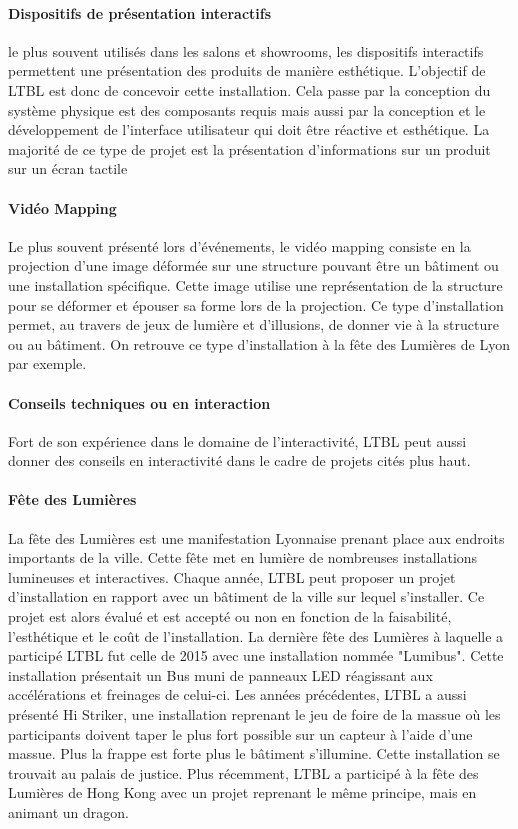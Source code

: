 \paragraph{Dispositifs de présentation interactifs} le plus souvent utilisés dans les salons et showrooms, les dispositifs interactifs permettent une présentation des produits de manière esthétique.
L'objectif de LTBL est donc de concevoir cette installation.
Cela passe par la conception du système physique est des composants requis mais aussi par la conception et le développement de l'interface utilisateur qui doit être réactive et esthétique.
La majorité de ce type de projet est la présentation d'informations sur un produit sur un écran tactile

\paragraph{Vidéo Mapping} Le plus souvent présenté lors d'événements, le vidéo mapping consiste en la projection d'une image déformée sur une structure pouvant être un bâtiment ou une installation spécifique.
Cette image utilise une représentation de la structure pour se déformer et épouser sa forme lors de la projection.
Ce type d'installation permet, au travers de jeux de lumière et d'illusions, de donner vie à la structure ou au bâtiment.
On retrouve ce type d'installation à la fête des Lumières de Lyon par exemple.

\paragraph{Conseils techniques ou en interaction} Fort de son expérience dans le domaine de l'interactivité, LTBL peut aussi donner des conseils en interactivité dans le cadre de projets cités plus haut.

\paragraph{Fête des Lumières} La fête des Lumières est une manifestation Lyonnaise prenant place aux endroits importants de la ville.
Cette fête met en lumière de nombreuses installations lumineuses et interactives.
Chaque année, LTBL peut proposer un projet d'installation en rapport avec un bâtiment de la ville sur lequel s'installer.
Ce projet est alors évalué et est accepté ou non en fonction de la faisabilité, l'esthétique et le coût de l'installation.
La dernière fête des Lumières à laquelle a participé LTBL fut celle de 2015 avec une installation nommée "Lumibus".
Cette installation présentait un Bus muni de panneaux LED réagissant aux accélérations et freinages de celui-ci.
Les années précédentes, LTBL a aussi présenté Hi Striker, une installation reprenant le jeu de foire de la massue où les participants doivent taper le plus fort possible sur un capteur à l'aide d'une massue.
Plus la frappe est forte plus le bâtiment s'illumine.
Cette installation se trouvait au palais de justice.
Plus récemment, LTBL a participé à la fête des Lumières de Hong Kong avec un projet reprenant le même principe, mais en animant un dragon.

